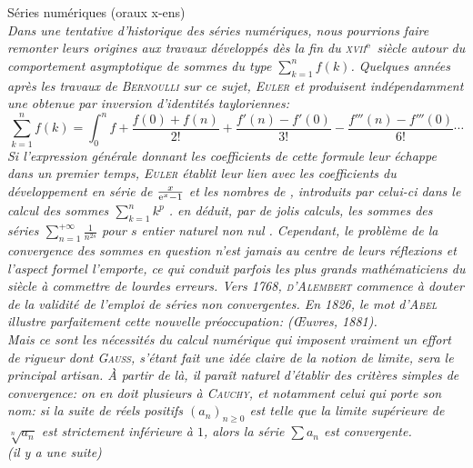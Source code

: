 Séries numériques (oraux x-ens)\\
\textsl{
Dans une tentative d'historique des séries numériques, nous pourrions faire remonter leurs origines aux travaux développés dès la fin du \textsc{xvii}$^{\mathrm{e}}$ siècle autour du comportement asymptotique de sommes du type $\sum\limits_{k=1}^n f(k)$. Quelques années après les travaux de \textsc{Bernoulli} sur ce sujet, \textsc{Euler} et  produisent indépendamment une  obtenue par inversion d'identités tayloriennes:
$$\sum_{k=1}^n f(k) = \int_0^n f + \frac{f(0) + f(n)}{2!} + \frac{f'(n) - f'(0)}{3!} - \frac{f'''(n) - f'''(0)}{6!}\cdots$$
Si l'expression générale donnant les coefficients de cette formule leur échappe dans un premier temps, \textsc{Euler} établit leur lien avec les coefficients du développement en série de $\frac{x}{\mathrm{e}^x-1}$ et les nombres de , introduits par celui-ci dans le calcul des sommes $\sum\limits_{k=1}^n k^p$ \note.  en déduit, par de jolis calculs, les sommes des séries $\sum\limits_{n=1}^{+\infty} \frac{1}{n^{2s}}$ pour $s$ entier naturel non nul \note.
Cependant, le problème de la convergence des sommes en question n'est jamais au centre de leurs réflexions et l'aspect formel l'emporte, ce qui conduit parfois les plus grands mathématiciens du siècle à commettre de lourdes erreurs. Vers 1768, \textsc{d'Alembert} commence à douter de la validité de l'emploi de séries non convergentes. En 1826, le mot d'\textsc{Abel} illustre parfaitement cette nouvelle préoccupation:  (Œuvres, 1881). \\
Mais ce sont les nécessités du calcul numérique qui imposent vraiment un effort de rigueur dont \textsc{Gauss}, s'étant fait une idée claire de la notion de limite, sera le principal artisan. À partir de là, il paraît naturel d'établir des critères simples de convergence: on en doit plusieurs à \textsc{Cauchy}, et notamment celui qui porte son nom: si la suite de réels positifs $(a_n)_{n \geqslant 0}$ est telle que la limite supérieure de $\sqrt[n]{a_n}$ est strictement inférieure à $1$, alors la série $\sum a_n$ est convergente. \\
(il y a une suite)
}